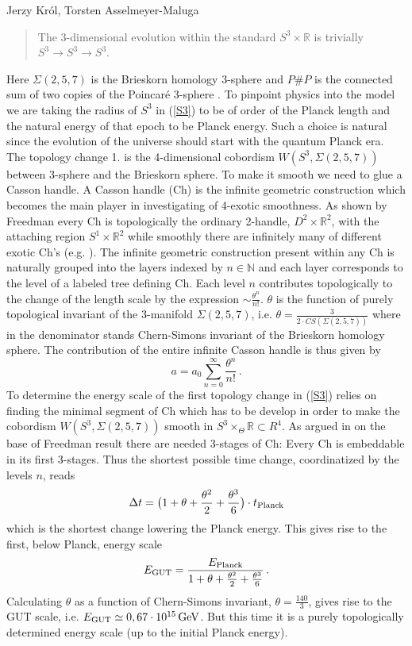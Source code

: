 \begin{artengenv2auth}{Jerzy Kr\'ol, Torsten Asselmeyer-Maluga}
\begin{quotation}
The 3-dimensional evolution within the standard $S^3\times \mathbb{R}$ is trivially $S^3\to S^3\to S^3$.
\end{quotation}
Here $\Sigma(2,5,7)$ is the Brieskorn homology 3-sphere and $P\# P$ is the connected sum of two copies of the Poincar{\'e} 3-sphere \parencite{AK2018,AK2019}. To pinpoint physics into the model we are taking the radius of $S^3$ in (\ref{S3}) to be of order of the Planck length and the natural energy of that epoch to be Planck energy. Such a choice is natural since the evolution of the universe should start with the quantum Planck era. The topology change 1. is the 4-dimensional cobordism $W(S^3,\Sigma(2,5,7))$ between 3-sphere and the Brieskorn sphere. To make it smooth we need to glue a Casson handle. A Casson handle (Ch) is the infinite geometric construction which becomes the main player in investigating of 4-exotic smoothness. As shown by Freedman every Ch is topologically the ordinary 2-handle, $D^2\times \mathbb{R}^2$, with the attaching region $S^1\times \mathbb{R}^2$ while smoothly there are infinitely many of different exotic Ch's (e.g. \cite{GS1999}). The infinite geometric construction present within any Ch is naturally grouped into the layers indexed by $n\in \mathbb{N}$ and each layer corresponds to the level of a labeled tree defining Ch. Each level $n$ contributes topologically to the change of the length scale by the expression $\sim \frac{\theta^n}{n!}$. $\theta$ is the function of purely topological invariant of the 3-manifold $\Sigma(2,5,7)$, i.e. $\theta =\frac{3}{2\cdot CS(\Sigma(2,5,7))}$ where in the denominator stands Chern-Simons invariant of the Brieskorn homology sphere. The contribution of the entire infinite Casson handle is thus given by \parencite{AK2018,AK2014,AK2019}
\begin{equation}\label{exp1} a=a_0\sum_{n=0}^{\infty}\frac{\theta^n}{n!}\,. \end{equation}
To determine the energy scale of the first topology change in (\ref{S3}) relies on finding the minimal segment of Ch which has to be develop in order to make the cobordism $W(S^3,\Sigma(2,5,7))$ smooth in $S^3\times_{\Theta}\mathbb{R}\subset R^4$. As argued in \parencite{AK2014,AK2019} on the base of Freedman result there are needed 3-stages of Ch: Every Ch is embeddable in its first 3-stages. Thus the shortest possible time change, coordinatized by the levels $n$, reads \parencite{AK2014,AK2019} 
\[ \Delta t= \big(1+ \theta + \frac{\theta^2}{2}+\frac{\theta^3}{6}\big)\cdot t_{\rm Planck} \]
which is the shortest change lowering the Planck energy. This gives rise to the first, below Planck, energy scale
\[E_{\rm GUT}= \frac{E_{\rm Planck}}{1+ \theta + \frac{\theta^2}{2}+\frac{\theta^3}{6}}\,. \] 
Calculating $\theta$ as a function of Chern-Simons invariant, $\theta=\frac{140}{3}$, gives rise to the GUT scale, i.e. $E_{\rm GUT}\simeq 0,67\cdot 10^{15}\, {\rm GeV}$. But this time it is a purely topologically determined energy scale (up to the initial Planck energy). 


\end{artengenv2auth}
